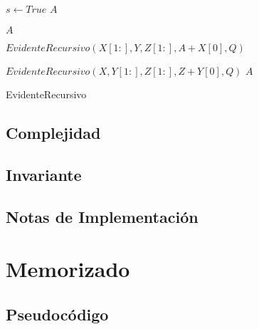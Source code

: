 \documentclass[]{article}
\numberwithin{equation}{section}
\numberwithin{figure}{section}
\theoremstyle{definition}
\begin{document}
	\begin{algorithm}[H]
	\begin{algorithmic}[1]


  			\State $s \leftarrow True$
  			\State\Return $A$
  		\EndIf
  		
  		
  				\State\Return $A$
  			\EndIf
  			
  						\State $EvidenteRecursivo(X[1:],Y,Z[1:],A+X[0],Q) $
  					\EndIf
  					
  				\EndIf
  						\State $EvidenteRecursivo(X,Y[1:],Z[1:],Z+Y[0],Q)$
  					\EndIf
  				\EndIf
  			\EndIf
  		\EndIf
  		\State\Return $A$

	\EndProcedure

	\end{algorithmic}
	\caption{\foreignlanguage{english}{EvidenteRecursivo}}
	\end{algorithm}
	
	
	\subsection*{Complejidad}
	
	\subsection*{Invariante}
	
	\subsection*{Notas de Implementación}

\section*{Memorizado}

	\subsection*{Pseudocódigo}
	
\end{document}
